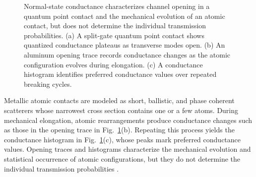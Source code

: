             \begin{figure}
                \centering
                \hfill
                \hfill

                \caption{
                    Normal-state conductance characterizes channel opening in a quantum point contact and the mechanical evolution of an atomic contact, but does not determine the individual transmission probabilities.
                (a) A split-gate quantum point contact shows quantized conductance plateaus as transverse modes open.
                (b) An aluminum opening trace records conductance changes as the atomic configuration evolves during elongation.
                (c) A conductance histogram identifies preferred conductance values over repeated breaking cycles.
                }
                \label{fig:quasi:atomic-contact}
            \end{figure}

            Metallic atomic contacts are modeled as short, ballistic, and phase coherent scatterers whose narrowest cross section contains one or a few atoms. During mechanical elongation, atomic rearrangements produce conductance changes such as those in the opening trace in Fig.~\ref{fig:quasi:atomic-contact}(b). Repeating this process yields the conductance histogram in Fig.~\ref{fig:quasi:atomic-contact}(c), whose peaks mark preferred conductance values. Opening traces and histograms characterize the mechanical evolution and statistical occurrence of atomic configurations, but they do not determine the individual transmission probabilities \cite{scheer_conduction_1997,yanson_histograms_1997,agrait_quantum_2003}.

